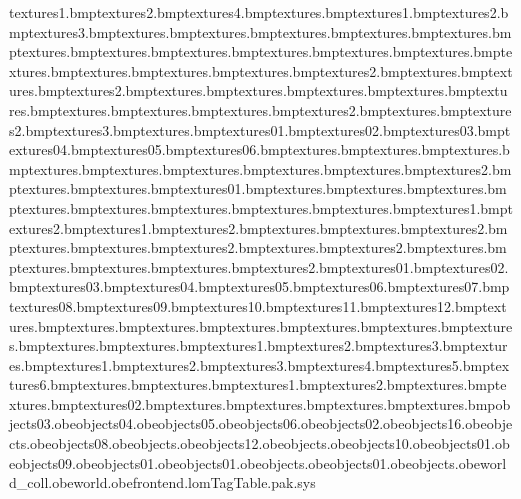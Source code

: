 textures\wbridge1.bmp textures\wbridge2.bmp textures\wbridge4.bmp textures\woodposts.bmp textures\bush1.bmp textures\bush2.bmp textures\bush3.bmp textures\bushfringe.bmp textures\caveent.bmp textures\cavefloor.bmp textures\chairarms.bmp textures\chairback.bmp textures\chairlegs.bmp textures\clock.bmp textures\clockback.bmp textures\clockface.bmp textures\clocklight.bmp textures\clockshine.bmp textures\drainpipe.bmp textures\drainpipeend.bmp textures\edger.bmp textures\gbush.bmp textures\gbush2.bmp textures\gramarm.bmp textures\gramarmcor.bmp textures\gramarmcor2.bmp textures\grambox.bmp textures\gramhorn.bmp textures\gramnut.bmp textures\gramshine.bmp textures\gramshined.bmp textures\gramtop.bmp textures\grass.bmp textures\grassedge.bmp textures\grassedge2.bmp textures\grassshad.bmp textures\grassshad2.bmp textures\grassshad3.bmp textures\hands.bmp textures\hubflowers01.bmp textures\hubflowers02.bmp textures\hubflowers03.bmp textures\hubflowers04.bmp textures\hubflowers05.bmp textures\hubflowers06.bmp textures\hutcane.bmp textures\hutends.bmp textures\hutfloor.bmp textures\hutinsidewall.bmp textures\hutposts.bmp textures\hutwall.bmp textures\hutwallpallet.bmp textures\hutwallpatch.bmp textures\hutwallpatch2.bmp textures\hutwood.bmp textures\hutwoodlight.bmp textures\leaf01.bmp textures\palmleaf.bmp textures\pbush.bmp textures\plambark.bmp textures\plungerbhole.bmp textures\plungerbox.bmp textures\plungerboxacme.bmp textures\plungerchrome.bmp textures\posttop.bmp textures\purpbush1.bmp textures\purpbush2.bmp textures\purpvine1.bmp textures\purpvine2.bmp textures\record.bmp textures\reeds.bmp textures\reeds2.bmp textures\rock.bmp textures\roof.bmp textures\roof2.bmp textures\roofedge.bmp textures\roofedge2.bmp textures\roofinside.bmp textures\steppegs.bmp textures\steps.bmp textures\tazpath.bmp textures\tazpath2.bmp textures\tazrock01.bmp textures\tazrock02.bmp textures\tazrock03.bmp textures\tazrock04.bmp textures\tazrock05.bmp textures\tazrock06.bmp textures\tazrock07.bmp textures\tazrock08.bmp textures\tazrock09.bmp textures\tazrock10.bmp textures\tazrock11.bmp textures\tazrock12.bmp textures\tazsign.bmp textures\tempfloor.bmp textures\templebanister.bmp textures\templeyellow.bmp textures\tempwall.bmp textures\tire.bmp textures\tiretred.bmp textures\tree.bmp textures\treeend.bmp textures\vine1.bmp textures\vine2.bmp textures\vine3.bmp textures\vinespecial.bmp textures\vinestemple1.bmp textures\vinestemple2.bmp textures\vinestemple3.bmp textures\vinestemple4.bmp textures\vinestemple5.bmp textures\vinestemple6.bmp textures\water.bmp textures\waterfallbot.bmp textures\waterfallbot1.bmp textures\waterfallbot2.bmp textures\waterfalltop.bmp textures\bell.bmp textures\hubpath02.bmp textures\fpurp.bmp textures\fred.bmp textures\fgre.bmp textures\fblu.bmp objects\box03.obe objects\box04.obe objects\box05.obe objects\box06.obe objects\palm02.obe objects\box16.obe objects\hut.obe objects\box08.obe objects\chair.obe objects\cylinder12.obe objects\fence.obe objects\box10.obe objects\object01.obe objects\box09.obe objects\reeds01.obe objects\hut01.obe objects\water.obe objects\box01.obe objects\plant.obe world_coll.obe world.obe frontend.lom TagTable.pak.sys 